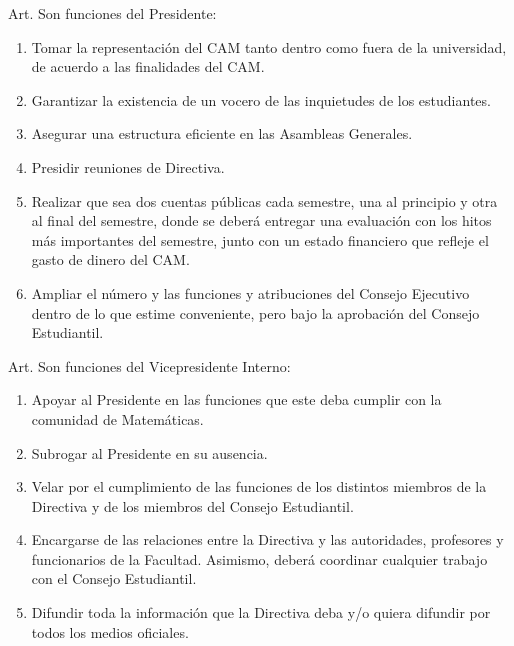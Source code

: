 \documentclass[letterpaper,11pt]{article}
\newcounter{art}
\newenvironment{art}{
    Art.\refstepcounter{art} \theart\:
}{}
\begin{document}
\begin{art}\label{funcionesPresidente}
    Son funciones del Presidente:
    \begin{enumerate}
        \item Tomar la representación del CAM tanto dentro como fuera de la universidad, de acuerdo a las finalidades del CAM.
        \item Garantizar la existencia de un vocero de las inquietudes de los estudiantes.
        \item Asegurar una estructura eficiente en las Asambleas Generales.
        \item Presidir reuniones de Directiva.
        \item Realizar que sea dos cuentas públicas cada semestre, una al principio y otra al final del semestre, donde se deberá entregar una evaluación con los hitos más importantes del semestre, junto con un estado financiero que refleje el gasto de dinero del CAM.
        \item Ampliar el número y las funciones y atribuciones del Consejo Ejecutivo dentro de lo que estime conveniente, pero bajo la aprobación del Consejo Estudiantil.
    \end{enumerate}
\end{art}

\begin{art}\label{funcionesVicepresidenteInterno}
    Son funciones del Vicepresidente Interno:
    \begin{enumerate}
        \item Apoyar al Presidente en las funciones que este deba cumplir con la comunidad de Matemáticas.
        \item Subrogar al Presidente en su ausencia.
        \item Velar por el cumplimiento de las funciones de los distintos miembros de la Directiva y de los miembros del Consejo Estudiantil.
        \item Encargarse de las relaciones entre la Directiva y las autoridades, profesores y funcionarios de la Facultad. Asimismo, deberá coordinar cualquier trabajo con el Consejo Estudiantil.%
        \item Difundir toda la información que la Directiva deba y/o quiera difundir por todos los medios oficiales.
    \end{enumerate}
\end{art}
\end{document}
